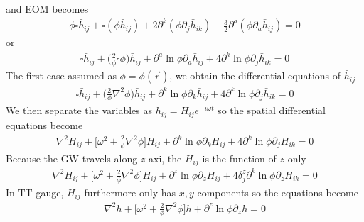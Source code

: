 \documentclass[
 jor,
 amsmath,amssymb,preprint,
]{revtex4-2}
\begin{document}
and EOM becomes
\begin{equation}
\begin{aligned}
\phi\square \bar{h}_{ij} + \square (\phi \bar{h}_{ij}) + 2\partial^k(\phi\partial_j \bar{h}_{ik}) - \frac{3}{2}\partial^a (\phi \partial_a \bar{h}_{ij}) = 0
\end{aligned}
\end{equation}
or
\begin{equation}
\begin{aligned}
\square \bar{h}_{ij} + \bigg(\frac{2}{\phi}\square \phi \bigg)\bar{h}_{ij} + \partial^a \ln\phi \partial_a\bar{h}_{ij} + 4\partial^k \ln\phi\partial_j \bar{h}_{ik} = 0
\end{aligned}
\end{equation}
The first case assumed as $\phi = \phi(\vec{r})$, we obtain the differential equations of $\bar{h}_{ij}$
\begin{equation}
\begin{aligned}
\square \bar{h}_{ij} + \bigg(\frac{2}{\phi}\nabla^2 \phi\bigg) \bar{h}_{ij} + \partial^k \ln\phi \partial_k \bar{h}_{ij} + 4\partial^k \ln\phi\partial_j \bar{h}_{ik} = 0
\end{aligned}
\end{equation}
We then separate the variables as $\bar{h}_{ij} = H_{ij}e^{-i\omega t}$ so the spatial differential equations become
\begin{equation}
\begin{aligned}
\nabla^2H_{ij} + \bigg[ \omega^2 + \frac{2}{\phi}\nabla^2 \phi\bigg]H_{ij} + \partial^k \ln\phi \partial_k H_{ij} + 4\partial^k \ln\phi\partial_j H_{ik} = 0
\end{aligned}
\end{equation}
Because the GW travels along $z$-axi, the $H_{ij}$ is the function of $z$ only
\begin{equation}
\begin{aligned}
\nabla^2 H_{ij} + \bigg[ \omega^2 + \frac{2}{\phi}\nabla^2 \phi \bigg]H_{ij} + \partial^z \ln\phi \partial_z H_{ij} + 4\delta^z_j\partial^k \ln\phi\partial_z H_{ik} = 0
\end{aligned}
\end{equation}
In TT gauge, $H_{ij}$ furthermore only has $x,y$ components so the equations become
\begin{equation}
\begin{aligned}
\nabla^2 h + \bigg[ \omega^2 + \frac{2}{\phi}\nabla^2 \phi \bigg]h + \partial^z \ln\phi \partial_z h = 0 \label{desspteq1}
\end{aligned}
\end{equation}
\end{document}
